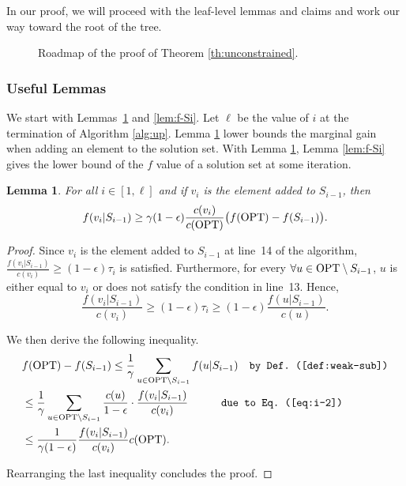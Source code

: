 \documentclass[10pt]{article} %
\newtheorem{lemma}[theorem]{Lemma}
\theoremstyle{remark}
\newcommand{\OPT}{{\rm OPT}}
\begin{document}
In our proof, we will proceed with the leaf-level lemmas and claims and work our way toward the root of the tree.

\begin{figure}
\begin{figure}[omitted: a diagram of this paper's results, not reproduced here]\end{figure}
\caption{Roadmap of the proof of Theorem \ref{th:unconstrained}.}
\label{fig:roadmap}
\end{figure}

\subsubsection{Useful Lemmas}
We start with Lemmas~\ref{lem:marginal-gain} and \ref{lem:f-Si}. Let $\ell$ be the value of $i$ at the termination of Algorithm \ref{alg:up}. Lemma \ref{lem:marginal-gain} lower bounds the marginal gain when adding an element to the solution set. With Lemma \ref{lem:marginal-gain}, Lemma \ref{lem:f-Si} gives the lower bound of the $f$ value of a solution set at some iteration.

\begin{lemma}
\label{lem:marginal-gain}
For all $i \in [1,\ell]$ and if $v_i$ is the element added to $S_{i-1}$, then
\[ 
f(v_i|S_{i-1}) \geq \gamma(1-\epsilon) \frac{c(v_i)}{c(\OPT)} \big ( f(\OPT) - f(S_{i-1}) \big ). 
\]
\end{lemma}

\begin{proof} 
Since $v_i$ is the element added to $S_{i-1}$ at line~14 of the algorithm,
$\frac{f(v_i|S_{i-1})}{c(v_i)}\geq {(1-\epsilon)\tau_i}$ is satisfied. Furthermore, for every 
$\forall u\in \OPT \setminus S_{i-1}$, $u$ is either equal to $v_i$ or does not satisfy the condition in line~13. Hence, 
\begin{equation}
\frac{f(v_i|S_{i-1})}{c(v_i)}\geq {(1-\epsilon)\tau_i} \geq (1-\epsilon) \frac{f(u|S_{i-1})}{c(u)}.
\label{eq:i-2}
\end{equation}

We then derive the following inequality.
\begin{align*}
    & f(\OPT)-f(S_{i-1}) \leq \frac{1}{\gamma} \sum_{u\in \OPT \setminus S_{i-1}} f(u|S_{i-1}) \quad\mbox{\tt  by Def.~(\ref{def:weak-sub})} \\
    &\leq \frac{1}{\gamma} \sum_{u\in \OPT \setminus S_{i-1}} \frac{c(u)}{1-\epsilon} \cdot \frac{f(v_i|S_{i-1})}{c(v_i)}  \quad\quad\quad\mbox{\tt  due to Eq.~(\ref{eq:i-2})} \\
    &\leq \frac{1}{\gamma(1-\epsilon)} \frac{f(v_i|S_{i-1})}{c(v_i)} c(\OPT).
\end{align*}

Rearranging the last inequality concludes the proof.     
\end{proof}
\end{document}
